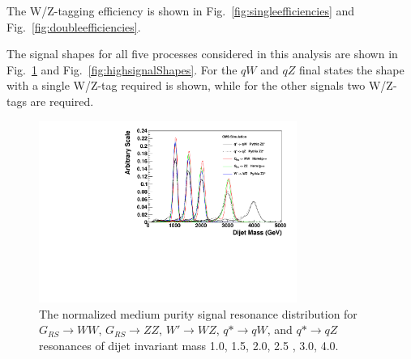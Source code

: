 The W/Z-tagging efficiency is shown in Fig.~\ref{fig:singleefficiencies} and Fig.~\ref{fig:doubleefficiencies}.


The signal shapes for all five processes considered in this analysis are shown in Fig.~\ref{fig:mediumsignalShapes} and Fig.~\ref{fig:highsignalShapes}.  
For the $qW$ and $qZ$ final states the shape with a single W/Z-tag required is shown, while for the other signals two W/Z-tags are required.



\begin{figure}[htb]
\begin{center}
\includegraphics[width=0.75\textwidth]{EXO-12-024/figs/signal-acc-eff/resonance-shape-medium.pdf}
\end{center}
\caption{The normalized medium purity signal resonance distribution for  $G_{RS}\to WW$, $G_{RS}\to ZZ$, $W' \to WZ$, $q*\to qW$, and $q*\to qZ$ resonances of dijet invariant mass 1.0\TeVcc, 1.5\TeVcc, 2.0\TeVcc, 2.5 \TeVcc,  3.0\TeVcc, 4.0\TeVcc.
}
\label{fig:mediumsignalShapes}
\end{figure}


